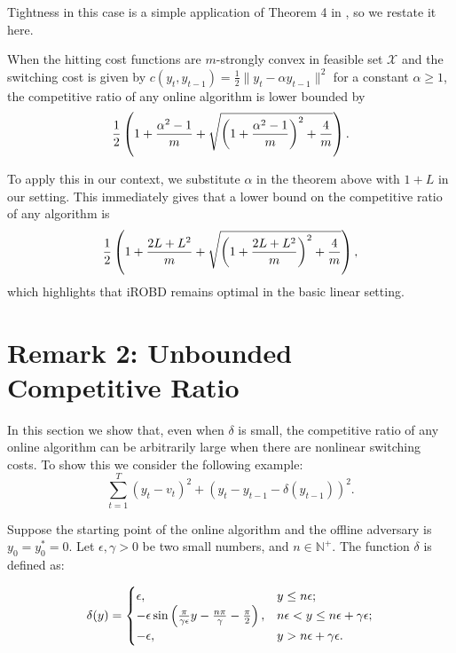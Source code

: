 Tightness in this case is a simple application of Theorem 4 in \citep{shi2020online}, so we restate it here.

\begin{theorem}
When the hitting cost functions are $m$-strongly convex in feasible set $\mathcal{X}$ and the switching cost is given by $c(y_t,y_{t-1})=\frac{1}{2}\|y_t-\alpha y_{t-1}\|^2$ for a constant $\alpha\ge1$, the competitive ratio of any online algorithm is lower bounded by
\begin{align}
    \frac{1}{2}\left(1+\frac{\alpha^2-1}{m}+\sqrt{\left(1+\frac{\alpha^2-1}{m}\right)^2+\frac{4}{m}}\right).\notag
\end{align}
\end{theorem}

To apply this in our context, we substitute $\alpha$ in the theorem above with $1+L$ in our setting.  This  immediately gives that a lower bound on the competitive ratio of any algorithm is 
\begin{align}
    \frac{1}{2}\left(1+\frac{2L+L^2}{m}+\sqrt{\left(1+\frac{2L+L^2}{m}\right)^2+\frac{4}{m}}\right),\notag
\end{align}
which highlights that iROBD remains optimal in the basic linear setting.


\section{Remark 2: Unbounded Competitive Ratio}\label{appendix.remark2}
In this section we show that, even when $\delta$ is small, the competitive ratio of any online algorithm can be arbitrarily large when there are nonlinear switching costs. To show this we consider the following example:  $$\sum_{t=1}^T(y_t-v_t)^2+(y_t-y_{t-1}-\delta(y_{t-1}))^2.$$

Suppose the starting point of the online algorithm and the offline adversary is $y_0=y_0^*=0$. Let $\epsilon,\gamma>0$ be two small numbers, and $n\in\mathbb{N}^+$. The function $\delta$ is defined as:

\begin{align}
\delta(y)=\begin{cases}
\epsilon, & y\le n\epsilon; \\
-\epsilon\sin\left(\frac{\pi}{\gamma\epsilon}y-\frac{n\pi}{\gamma}-\frac{\pi}{2}\right), & n\epsilon<y\le n\epsilon+\gamma\epsilon;\\
-\epsilon, & y>n\epsilon+\gamma\epsilon.
\end{cases}\notag    
\end{align}

